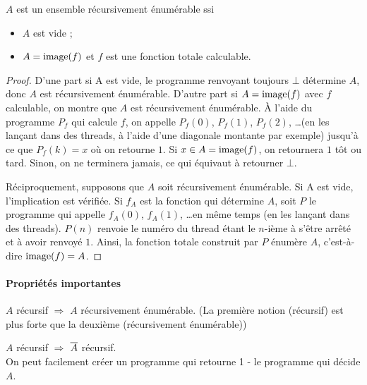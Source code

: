 \begin{myprop}
	$A$ est un ensemble récursivement énumérable ssi
    \begin{itemize}
      \item $A$ est vide ;
      \item $A = \operatorname{image}(f)$ et $f$ est une fonction totale calculable.
    \end{itemize}

    \begin{proof}
      D'une part si A est vide, le programme renvoyant toujours $\bot$ détermine $A$, donc $A$ est récursivement énumérable.
      D'autre part si $A=\operatorname{image}(f)$ avec $f$ calculable, on montre que $A$ est récursivement énumérable. À l'aide du programme $P_f$ qui calcule $f$,
      on appelle $P_f(0)$, $P_f(1)$, $P_f(2)$, \dots (en les lançant dans des threads, à l'aide d'une diagonale montante par exemple)
      jusqu'à ce que $P_f(k) = x$ où on retourne $1$. Si $x \in A=\operatorname{image}(f)$, on retournera $1$ tôt ou tard. Sinon, on ne terminera jamais,
      ce qui équivaut à retourner $\bot$.

      Réciproquement, supposons que $A$ soit récursivement énumérable. Si A est vide, l'implication est vérifiée. Si $f_A$ est la fonction
      qui détermine $A$, soit $P$ le programme qui appelle $f_A(0)$, $f_A(1)$, \dots en même temps (en les lançant dans des threads).
      $P(n)$ renvoie le numéro du thread étant le $n$-ième à s'être arrêté et à avoir renvoyé $1$. Ainsi, la fonction totale construit
      par $P$ énumère $A$, c'est-à-dire $\operatorname{image}(f) =A$.
    \end{proof}
\end{myprop}


\paragraph{Propriétés importantes}
\label{par:propri_t_s_importantes}
\begin{myprop}
\label{prop:recursif_implique_recursivement_enumerable}
	$A$ récursif $\Rightarrow$ $A$ récursivement énumérable. (La première notion (récursif) est plus forte que la deuxième (récursivement énumérable))
\end{myprop}

\begin{myprop}
	$A$ récursif $\Rightarrow$ $\overline{A}$ récursif.\\ On peut facilement créer
		un programme qui retourne 1 - le programme qui décide $A$.
\end{myprop}

